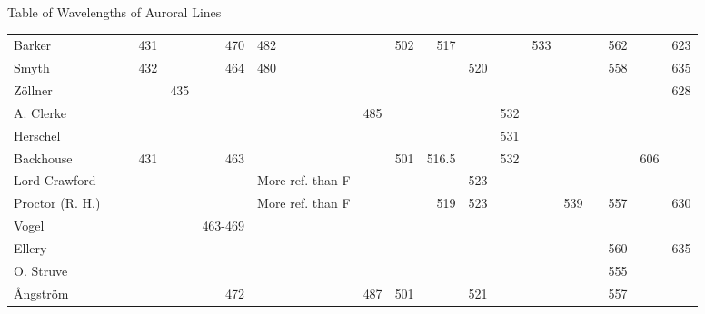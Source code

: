 \documentclass[a4paper, 12pt, oneside, polutonikogreek, english]{article}
\begin{document}
\begin{landscape}
Table of Wavelengths of Auroral Lines
\begin{center}
    \scriptsize
    \begin{longtable}{p{30mm} | r | r | r | r | r | p{15mm} | r | r | r | r | r | r | r | r | r | r | r |}
         Barker                 &     &     & 431 &     & 470 & 482 &     & 502 & 517 &      &     & 533 &     &      & 562 &      & 623 \\ 
         Smyth                  &     &     & 432 &     & 464 & 480 &     &     &      & 520 &     &     &     &      & 558 &      & 635 \\ 
         Zöllner                 &     &     &     & 435 &       &           &     &     &      &      &     &     &     &      &      &      & 628 \\ 
         A. Clerke                &     &     &     &     &       &           & 485 &     &      &      & 532 &     &     &      &      &      &     \\ 
         Herschel                &     &     &     &     &       &           &     &     &      &      & 531 &     &     &      &      &      &     \\ 
         Backhouse                &     &     & 431 &     & 463 &           &     & 501 & 516.5 &      & 532 &     &     &      &      & 606 &     \\ 
         Lord Crawford              &     &     &     &     &       &  More ref. than F  &     &     &      & 523 &     &     &     &      &      &      &     \\ 
         Proctor (R. H.)             &     &     &     &     &       &  More ref. than F  &     &     & 519 & 523 &     &     & 539 &      & 557 &      & 630 \\ 
         Vogel                  &     &     &     &     &  463-469  &           &     &     &      &      &     &     &     &      &      &      &     \\ 
         Ellery                 &     &     &     &     &       &           &     &     &      &      &     &     &     &      & 560 &      & 635 \\ 
         O. Struve                &     &     &     &     &       &           &     &     &      &      &     &     &     &      & 555 &      &     \\ 
         Ångström                &     &     &     &     & 472 &           & 487 & 501 &      & 521 &     &     &     &      & 557 &      &     \\ 

\end{longtable}
\end{center}
\end{landscape}
\end{document}
